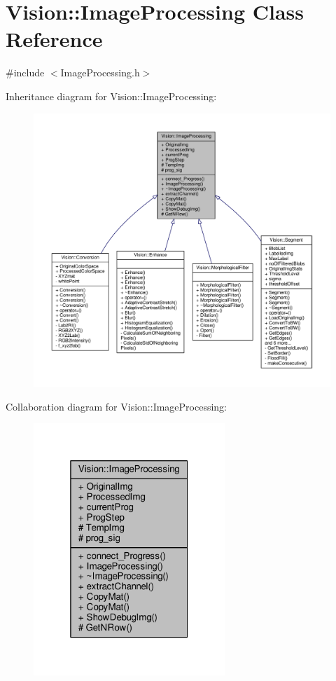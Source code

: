 \hypertarget{class_vision_1_1_image_processing}{}\section{Vision\+:\+:Image\+Processing Class Reference}
\label{class_vision_1_1_image_processing}


{\ttfamily \#include $<$Image\+Processing.\+h$>$}



Inheritance diagram for Vision\+:\+:Image\+Processing\+:\nopagebreak
\begin{figure}[H]
\begin{center}
\leavevmode
\includegraphics[width=350pt]{class_vision_1_1_image_processing__inherit__graph}
\end{center}
\end{figure}


Collaboration diagram for Vision\+:\+:Image\+Processing\+:\nopagebreak
\begin{figure}[H]
\begin{center}
\leavevmode
\includegraphics[width=205pt]{class_vision_1_1_image_processing__coll__graph}
\end{center}
\end{figure}

